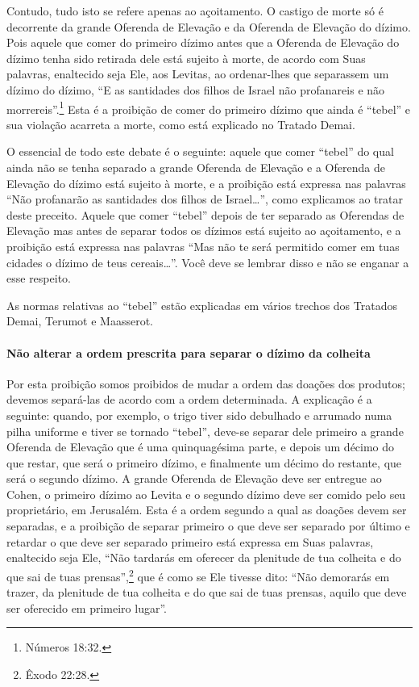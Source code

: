 Contudo, tudo isto se refere apenas ao açoitamento. O castigo de morte
só é decorrente da grande Oferenda de Elevação e da Oferenda de
Elevação do dízimo. Pois aquele que comer do primeiro dízimo antes que
a Oferenda de Elevação do dízimo tenha sido retirada dele está sujeito
à morte, de acordo com Suas palavras, enaltecido seja Ele, aos Levitas,
ao ordenar-lhes que separassem um dízimo do dízimo, ``E as santidades
dos filhos de Israel não profanareis e não morrereis''.\footnote{Números 18:32.}
Esta é a proibição de comer do primeiro dízimo que ainda é ``tebel'' e
sua violação acarreta a morte, como está explicado no Tratado Demai.

O essencial de todo este debate é o seguinte: aquele que comer
``tebel'' do qual ainda não se tenha separado a grande Oferenda de
Elevação e a Oferenda de Elevação do dízimo está sujeito à morte, e a
proibição está expressa nas palavras ``Não profanarão as santidades dos
filhos de Israel\ldots{}'', como explicamos ao tratar deste preceito. Aquele
que comer ``tebel'' depois de ter separado as Oferendas de Elevação mas
antes de separar todos os dízimos está sujeito ao açoitamento, e a
proibição está expressa nas palavras ``Mas não te será permitido comer
em tuas cidades o dízimo de teus cereais\ldots{}''. Você deve se lembrar
disso e não se enganar a esse respeito.

As normas relativas ao ``tebel'' estão explicadas em vários trechos dos
Tratados Demai, Terumot e Maasserot.

\paragraph{Não alterar a ordem prescrita para separar o dízimo da colheita}

Por esta proibição somos proibidos de mudar a ordem das doações dos
produtos; devemos separá-las de acordo com a ordem determinada. A
explicação é a seguinte: quando, por exemplo, o trigo tiver sido
debulhado e arrumado numa pilha uniforme e tiver se tornado ``tebel'',
deve-se separar dele primeiro a grande Oferenda de Elevação que é uma
quinquagésima parte, e depois um décimo do que restar, que será o
primeiro dízimo, e finalmente um décimo do restante, que será o segundo
dízimo. A grande Oferenda de Elevação deve ser entregue ao Cohen, o
primeiro dízimo ao Levita e o segundo dízimo deve ser comido pelo seu
proprietário, em Jerusalém. Esta é a ordem segundo a qual as doações
devem ser separadas, e a proibição de separar primeiro o que deve ser
separado por último e retardar o que deve ser separado primeiro está
expressa em Suas palavras, enaltecido seja Ele, ``Não tardarás em
oferecer da plenitude de tua colheita e do que sai de tuas prensas'',\footnote{Êxodo 22:28.} que é como se Ele tivesse dito: ``Não demorarás em
trazer, da plenitude de tua colheita e do que sai de tuas prensas, aquilo que deve ser oferecido em primeiro lugar''.

